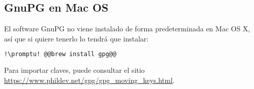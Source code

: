 \subsection{GnuPG en Mac OS}\label{subsec:gnupg-m}
El software GnuPG no viene instalado de forma predeterminada en Mac OS X, así que si quiere tenerlo lo tendrá
que instalar:

\begin{lstlisting}[gobble=2,language=bash,style=bashinteract,escapechar=!]
  !\promptu! @@brew install gpg@@
\end{lstlisting}

Para importar claves, puede consultar el sitio \url{https://www.phildev.net/gpg/gpg_moving_keys.html}.
